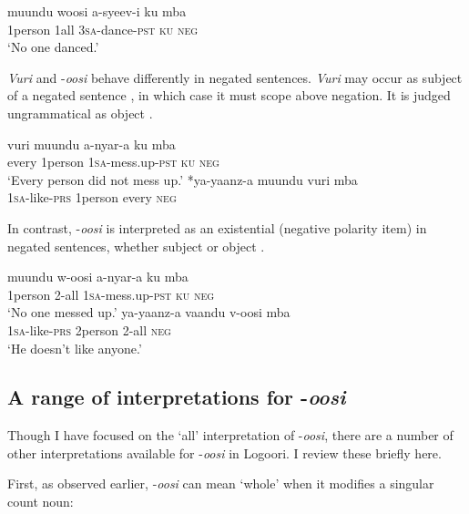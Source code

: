 \documentclass[output=paper]{langsci/langscibook}
\begin{document}
\ea\label{ex:landman:28}
\gll muundu   woosi  a-syeev-i    ku  mba\\
     1person\textsc{}    1all    3\textsc{sa}-dance-\textsc{pst}  \textsc{ku}  \textsc{neg} \\
\glt ‘No one danced.’
\z

  \textit{Vuri} and -\textit{oosi} behave differently in negated sentences. \textit{Vuri} may occur as subject of a negated sentence , in which case it must scope above negation. It is judged ungrammatical as object .

\ea\label{ex:landman:29} 
\ea\label{ex:landman:29a}
\gll vuri  muundu  a-nyar-a    ku  mba  \\
     every  1person  1\textsc{sa}-mess.up-\textsc{pst}  \textsc{ku}  \textsc{neg}\\
\glt ‘Every person did not mess up.’        
\ex\label{ex:landman:29b}
\gll \textup{*}ya-yaanz-a  muundu   vuri    mba \\
     1\textsc{sa}-like-\textsc{prs}  1person     every    \textsc{neg}\\
\z
\z

  In contrast, -\textit{oosi} is interpreted as an existential (negative polarity item) in negated sentences, whether subject  or object .

\ea\label{ex:landman:30} 
\ea\label{ex:landman:30a}
\gll muundu  w-oosi    a-nyar-a    ku  mba  \\
     1person  2-all    1\textsc{sa}-mess.up-\textsc{pst}  \textsc{ku  neg}\\
\glt ‘No one messed up.’        
\ex\label{ex:landman:30b}
\gll ya-yaanz-a  vaandu   v-oosi    mba \\
     1\textsc{sa}-like-\textsc{prs}  2person     2-all    \textsc{neg}\\
\glt ‘He doesn't like anyone.’
\z
\z

\subsection{A range of interpretations for -\textit{oosi}}\label{sec:landman:4.3}

Though I have focused on the ‘all’ interpretation of -\textit{oosi}, there are a number of other interpretations available for -\textit{oosi} in Logoori. I review these briefly here.

  First, as observed earlier, -\textit{oosi} can mean ‘whole’ when it modifies a singular count noun:
\end{document}
